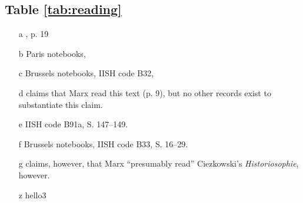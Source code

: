 \subsection{Table \ref{tab:reading}}

\begin{itemize}
    \item[a] \cite{evans_karl_1984}, p. 19
    \item[b] Paris notebooks, 
    \item[c] Brussels notebooks, IISH code B32, 
    \item[d] \cite{rubel_marx_1975} claims that Marx read this text (p. 9), but no other records exist to substantiate this claim.
    \item[e] IISH code B91a, S. 147--149.
    \item[f] Brussels notebooks, IISH code B33, S. 16--29.
    \item[g] \cite{rubel_marx_1975} claims, however, that Marx ``presumably read'' Ciezkowski's \textit{Historiosophie}, however.
    \item[z] hello3
\end{itemize}